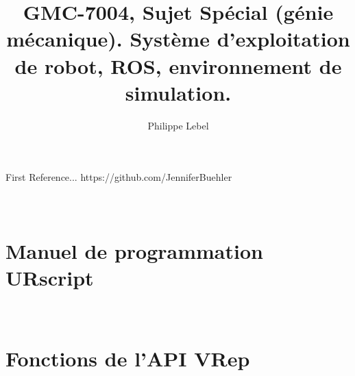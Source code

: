 \documentclass{articleUL}
\title{GMC-7004, Sujet Spécial (génie mécanique). Système d'exploitation de robot, ROS, environnement de simulation.}
\author{Philippe Lebel
 \affiliation{Université Laval, philippe.lebel.4@ulaval.ca}}
\begin{document}
 \maketitle
 
 \newpage
 
 
 
 
 
 \begin{thebibliography}{}
  First Reference...
  https://github.com/JenniferBuehler
 \end{thebibliography}
 \newpage
 \appendix
\section{\\Manuel de programmation URscript} \label{app:URscript_manual}



\section{\\Fonctions de l'API VRep} \label{app:VRep_manual}


 
\end{document}

